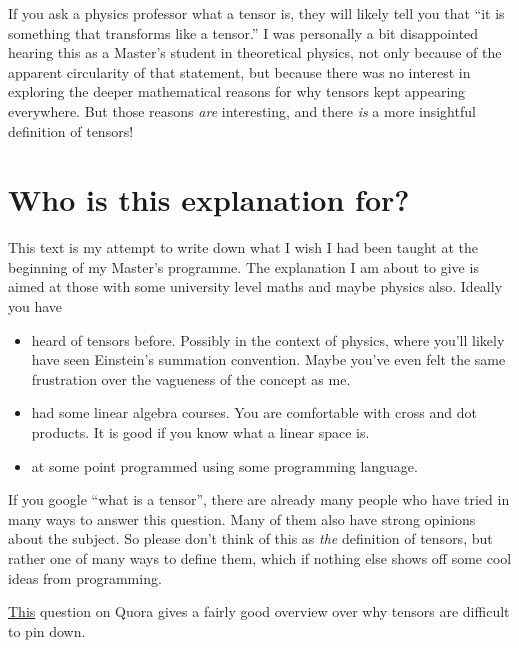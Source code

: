 \documentclass[english, 12pt]{article}
\begin{document}
 
\maketitle

If you ask a physics professor what a tensor is, they will likely tell you that \enquote{it is something that transforms like a tensor.}
I was personally a bit disappointed hearing this as a Master's student in theoretical physics, not only because of the apparent circularity of that statement, but because there was no interest in exploring the deeper mathematical reasons for why tensors kept appearing everywhere.
But those reasons \emph{are} interesting, and there \emph{is} a more insightful definition of tensors!

\section{Who is this explanation for?}%
\label{sec:who_is_this_explanation_for_}

This text is my attempt to write down what I wish I had been taught at the beginning of my Master's programme.
The explanation I am about to give is aimed at those with some university level maths and maybe physics also.
Ideally you have
\begin{itemize}
	\item heard of tensors before.
	Possibly in the context of physics, where you'll likely have seen Einstein's summation convention.
	Maybe you've even felt the same frustration over the vagueness of the concept as me.
	\item had some linear algebra courses.
	You are comfortable with cross and dot products.
	It is good if you know what a linear space is.
	\item at some point programmed using some programming language.
\end{itemize}

If you google \enquote{what is a tensor}, there are already many people who have tried in many ways to answer this question.
Many of them also have strong opinions about the subject.
So please don't think of this as \emph{the} definition of tensors, but rather one of many ways to define them, which if nothing else shows off some cool ideas from programming.

\href{https://www.quora.com/Why-is-it-difficult-to-explain-tensors?}{\color{blue}This} question on Quora gives a fairly good overview over why tensors are difficult to pin down.
\end{document}
